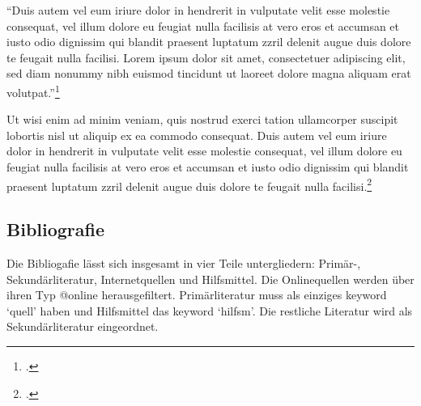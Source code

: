 \enquote{Duis autem vel eum iriure dolor in hendrerit in vulputate velit esse molestie consequat, vel illum dolore eu feugiat nulla facilisis at vero eros et accumsan et iusto odio dignissim qui blandit praesent luptatum zzril delenit augue duis dolore te feugait nulla facilisi. Lorem ipsum dolor sit amet, consectetuer adipiscing elit, sed diam nonummy nibh euismod tincidunt ut laoreet dolore magna aliquam erat volutpat.}\footcite[207]{Gnilka.1978}

Ut wisi enim ad minim veniam, quis nostrud exerci tation ullamcorper suscipit lobortis nisl ut aliquip ex ea commodo consequat. Duis autem vel eum iriure dolor in hendrerit in vulputate velit esse molestie consequat, vel illum dolore eu feugiat nulla facilisis at vero eros et accumsan et iusto odio dignissim qui blandit praesent luptatum zzril delenit augue duis dolore te feugait nulla facilisi.\footcites[Vgl.][]{Ego.2007}[Vgl.][289]{Gnilka.1978}

\subsection{Bibliografie}
Die Bibliogafie lässt sich insgesamt in vier Teile untergliedern: Primär-, Sekundärliteratur, Internetquellen und Hilfsmittel. Die Onlinequellen werden über ihren Typ @online herausgefiltert. Primärliteratur muss als einziges keyword \enquote*{quell} haben und Hilfsmittel das keyword \enquote*{hilfsm}. Die restliche Literatur wird als Sekundärliteratur eingeordnet.